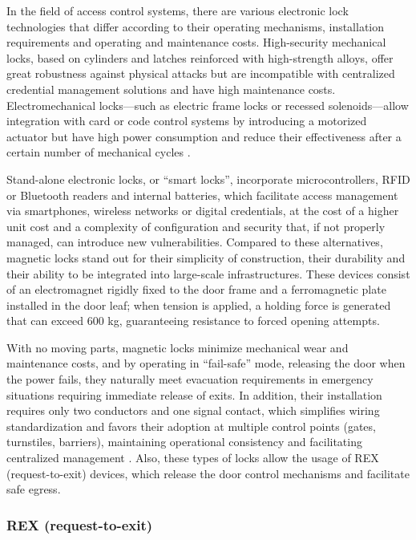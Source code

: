 In the field of access control systems, there are various electronic lock technologies that differ according to their operating mechanisms, installation requirements and operating and maintenance costs. High-security mechanical locks, based on cylinders and latches reinforced with high-strength alloys, offer great robustness against physical attacks but are incompatible with centralized credential management solutions and have high maintenance costs. Electromechanical locks—such as electric frame locks or recessed solenoids—allow integration with card or code control systems by introducing a motorized actuator but have high power consumption and reduce their effectiveness after a certain number of mechanical cycles \cite{ref38}.

Stand-alone electronic locks, or ``smart locks'', incorporate microcontrollers, RFID or Bluetooth readers and internal batteries, which facilitate access management via smartphones, wireless networks or digital credentials, at the cost of a higher unit cost and a complexity of configuration and security that, if not properly managed, can introduce new vulnerabilities. Compared to these alternatives, magnetic locks stand out for their simplicity of construction, their durability and their ability to be integrated into large-scale infrastructures. These devices consist of an electromagnet rigidly fixed to the door frame and a ferromagnetic plate installed in the door leaf; when tension is applied, a holding force is generated that can exceed 600 kg, guaranteeing resistance to forced opening attempts.

With no moving parts, magnetic locks minimize mechanical wear and maintenance costs, and by operating in ``fail-safe'' mode, releasing the door when the power fails, they naturally meet evacuation requirements in emergency situations requiring immediate release of exits. In addition, their installation requires only two conductors and one signal contact, which simplifies wiring standardization and favors their adoption at multiple control points (gates, turnstiles, barriers), maintaining operational consistency and facilitating centralized management \cite{ref39}. Also, these types of locks allow the usage of REX (request-to-exit) devices, which release the door control mechanisms and facilitate safe egress.

\subsubsection{REX (request-to-exit)}

